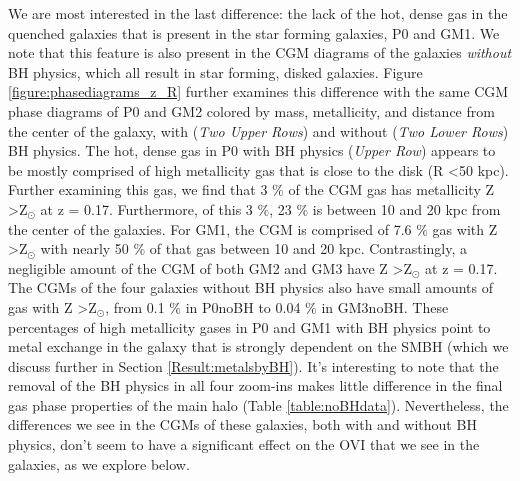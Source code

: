 \documentclass[]{emulateapj}
\begin{document}
We are most interested in the last difference: the lack of the hot, dense gas in the quenched galaxies that is present in the star forming galaxies, P0 and GM1. We note that this feature is also present in the CGM diagrams of the galaxies \textit{without} BH physics, which all result in star forming, disked galaxies. Figure \ref{figure:phasediagrams_z_R} further examines this difference with the same CGM phase diagrams of P0 and GM2 colored by mass, metallicity, and distance from the center of the galaxy, with (\textit{Two Upper Rows}) and without (\textit{Two Lower Rows}) BH physics. The hot, dense gas in P0 with BH physics (\textit{Upper Row}) appears to be mostly comprised of high metallicity gas that is close to the disk (R \textless 50 kpc). Further examining this gas, we find that 3 $\%$ of the CGM gas has metallicity Z \textgreater Z$_{\odot}$ at z = 0.17. Furthermore, of this 3 $\%$, 23 $\%$ is between 10 and 20 kpc from the center of the galaxies. For GM1, the CGM is comprised of 7.6 $\%$ gas with Z \textgreater Z$_{\odot}$ with nearly 50 $\%$ of that gas between 10 and 20 kpc. Contrastingly, a negligible amount of the CGM of both GM2 and GM3 have Z \textgreater Z$_{\odot}$ at z = 0.17. The CGMs of the four galaxies without BH physics also have small amounts of gas with Z \textgreater Z$_{\odot}$, from 0.1 $\%$ in P0noBH to 0.04 $\%$ in GM3noBH. These percentages of high metallicity gases in P0 and GM1 with BH physics point to metal exchange in the galaxy that is strongly dependent on the SMBH (which we discuss further in Section \ref{Result:metalsbyBH}). It's interesting to note that the removal of the BH physics in all four zoom-ins makes little difference in the final gas phase properties of the main halo (Table \ref{table:noBHdata}). Nevertheless, the differences we see in the CGMs of these galaxies, both with and without BH physics, don't seem to have a significant effect on the OVI that we see in the galaxies, as we explore below.
\end{document}
